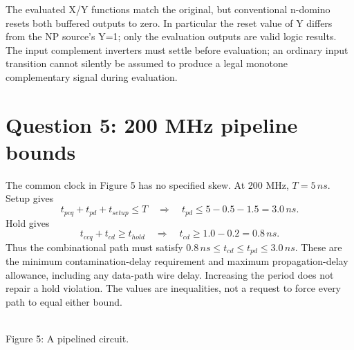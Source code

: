 \documentclass[10pt]{article}
\begin{document}
The evaluated X/Y functions match the original, but conventional n-domino resets both buffered outputs to zero. In particular the reset value of Y differs from the NP source's Y=1; only the evaluation outputs are valid logic results. The input complement inverters must settle before evaluation; an ordinary input transition cannot silently be assumed to produce a legal monotone complementary signal during evaluation.

\newpage\section*{Question 5: 200 MHz pipeline bounds}
The common clock in Figure 5 has no specified skew. At 200 MHz, $T=5\,ns$. Setup gives
\[t_{pcq}+t_{pd}+t_{setup}\le T\quad\Longrightarrow\quad
\boxed{t_{pd}\le5-0.5-1.5=3.0\,ns.}\]
Hold gives
\[t_{ccq}+t_{cd}\ge t_{hold}\quad\Longrightarrow\quad
\boxed{t_{cd}\ge1.0-0.2=0.8\,ns.}\]
Thus the combinational path must satisfy $\boxed{0.8\,ns\le t_{cd}\le t_{pd}\le3.0\,ns}$. These are the minimum contamination-delay requirement and maximum propagation-delay allowance, including any data-path wire delay. Increasing the period does not repair a hold violation. The values are inequalities, not a request to force every path to equal either bound.
\begin{center}\\Figure 5: A pipelined circuit.\end{center}
\end{document}

